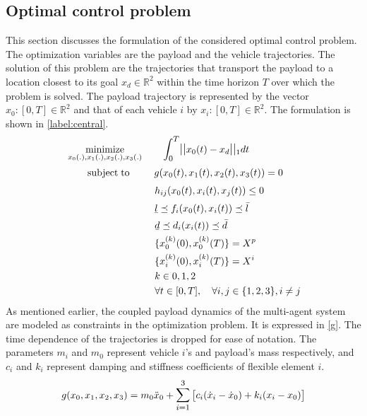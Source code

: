 \documentclass[letterpaper, 10 pt, conference]{ieeeconf}
\newcommand{\ubar}[1]{\text{\b{$#1$}}}
\DeclareMathOperator*{\minimize}{minimize}
\DeclareMathOperator*{\subj}{subject\;to}
\begin{document}
\subsection{Optimal control problem}
This section discusses the formulation of the considered optimal control problem. The optimization variables are the payload and the vehicle trajectories. The solution of this problem are the trajectories that transport the payload to a location closest to its goal $x_d \in \mathbb{R}^2$ within the time horizon $T$ over which the problem is solved.
The payload trajectory is represented by the vector ${x_0:[0,T] \in \mathbb{R}^2}$ and that of each vehicle $i$ by ${x_i:[0,T] \in \mathbb{R}^2}$.
 The formulation is shown in \eqref{label:central}.
\begin{equation}
  \label{label:central}
  \begin{aligned}
    & \minimize_{x_0(.),x_1(.),x_2(.),x_3(.)} \qquad \mathlarger{\int_0^T} \mathlarger{||}x_0(t)-x_d\mathlarger{||}_1 dt \\
    & \qquad \subj
     \qquad \text{  } g(x_0(t),x_1(t),x_2(t),x_3(t)) = 0 \\
    &	\qquad  \qquad \qquad \quad \quad \quad h_{ij}(x_0(t),x_i(t),x_j(t)) \leq 0 \\
    &	\qquad  \qquad \qquad \quad \quad \quad \ubar{l} \preceq f_i(x_0(t),x_i(t)) \preceq \bar{l}\\
    &	\qquad  \qquad \qquad \quad \quad \quad \ubar{d} \preceq d_i(x_i(t)) \preceq \bar{d} \\
    &	\qquad  \qquad \qquad \quad \quad \quad \{x_0^{(k)}(0), x_0^{(k)}(T)\}  = X^p \\
      &	\qquad  \qquad \qquad \quad \quad \quad \{x_i^{(k)}(0), x_i^{(k)}(T)\}  = X^i \\
       &	 \qquad \qquad \qquad \quad \quad \quad k\in{0,1,2} \\
    &	 \qquad \qquad \qquad \quad \quad \quad \forall t \in [0,T], \quad \forall i,j \in \{1,2,3\}, i \neq j
  \end{aligned}
\end{equation}
As mentioned earlier, the coupled payload dynamics of the multi-agent system are modeled as constraints in the optimization problem. It is expressed in \eqref{g}. The time dependence of the trajectories is dropped for ease of notation. The parameters $m_i$ and $m_0$ represent vehicle $i$'s and payload's mass respectively, and $c_i$ and $k_i$ represent damping and stiffness coefficients of flexible element $i$.
\begin{equation}\label{g}
\begin{aligned}
g(x_0,x_1,x_2,x_3) &= m_0\ddot{x}_0 +  \mathlarger{\sum\limits_{i=1}^{3}}
\begin{bmatrix}{c_i(\dot{x}_i-\dot{x}_0) + k_i(x_i - x_0)} \end{bmatrix}\\
\end{aligned}
\end{equation}
\end{document}
